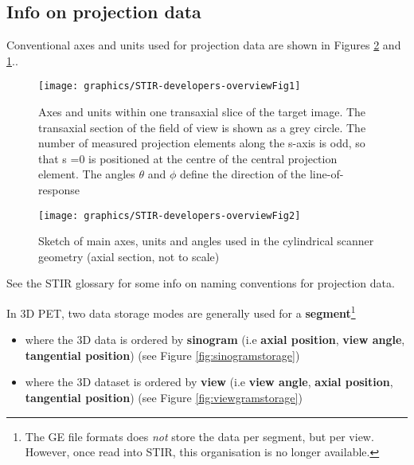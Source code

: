 \documentclass{article}
\begin{document}
\subsection{
Info on projection data}

Conventional axes and units used for projection data are shown 
in Figures \ref{scanner-image-units} and \ref{image-units}..

\begin{figure}[htbp]
\begin{center}
\texttt{[image: graphics/STIR-developers-overviewFig1]}
\caption{ Axes and units within one transaxial 
slice of the target image. The transaxial section of the field 
of view is shown as a grey circle. The number of measured projection 
elements along the s-axis is odd, so that s =0 is positioned 
at the centre of the central projection element. The angles \ensuremath{\theta} 
and \ensuremath{\phi} define the direction of the line-of-response }
\label{image-units}
\end{center}
\end{figure}

\begin{figure}[htbp]
\begin{center}
\texttt{[image: graphics/STIR-developers-overviewFig2]}
\caption{Sketch of main axes, units and angles used in the cylindrical 
scanner geometry (axial section, not to scale)}
\label{scanner-image-units}
\end{center}
\end{figure}


See the STIR glossary for some info on naming conventions for 
projection data.


In 3D PET, two data storage modes are generally used for a \textbf{segment}\footnote{{The 
GE file formats does \textit{not} store the data per segment, 
but per view. However, 
once read into STIR, this organisation is no longer available. 
}}
\begin{itemize}
\item 
where the 3D data is ordered by \textbf{sinogram} (i.e \textbf{axial position}, \textbf{view 
angle}, \textbf{tangential position})
(see Figure \ref{fig:sinogramstorage})
\item where the 3D dataset is ordered by \textbf{view} (i.e \textbf{view angle}, \textbf{axial 
position}, \textbf{tangential position})
(see Figure \ref{fig:viewgramstorage})
\end{itemize}
\end{document}
